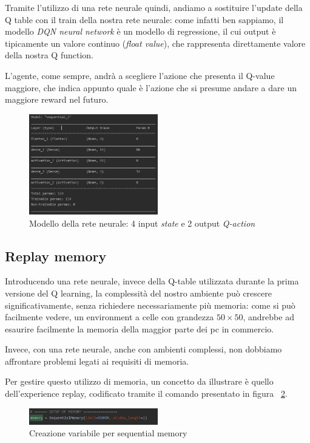 Tramite l'utilizzo di una rete neurale quindi, andiamo a sostituire l'update della Q table con il train della nostra rete neurale: come infatti ben sappiamo, il modello \textit{DQN neural network} è un modello di regressione, il cui output è tipicamente un valore continuo (\textit{float value}), che rappresenta direttamente valore della nostra Q function.

L'agente, come sempre, andrà a scegliere l'azione che presenta il Q-value maggiore, che indica appunto quale è l'azione che si presume andare a dare un maggiore reward nel futuro.

\begin{figure}[!h]
	\centering
	\includegraphics[width=0.5\textwidth]{Immagini/Model_of_my_net.JPG}
	\caption{Modello della rete neurale: 4 input \textit{state} e 2 output \textit{Q-action}}
	\label{fig:Model_of_DQN_network}
\end{figure} 


\subsection{Replay memory}
Introducendo una rete neurale, invece della Q-table utilizzata durante la prima versione del Q learning, la complessità del nostro ambiente può crescere significativamente, senza richiedere necessariamente più memoria: come si può facilmente vedere, un environment a celle con grandezza $50 \times 50$, andrebbe ad esaurire facilmente la memoria della maggior parte dei pc in commercio.

Invece, con una rete neurale, anche con ambienti complessi, non dobbiamo affrontare problemi legati ai requisiti di memoria.

Per gestire questo utilizzo di memoria, un concetto da illustrare è quello dell’experience replay, codificato tramite il comando presentato in figura ~\ref{fig:SeqMem}.

\begin{figure}[!h]
	\centering
	\includegraphics[width=0.5\textwidth]{Immagini/SequentialMemory.JPG}
	\caption{Creazione variabile per sequential memory}
	\label{fig:SeqMem}
\end{figure}

